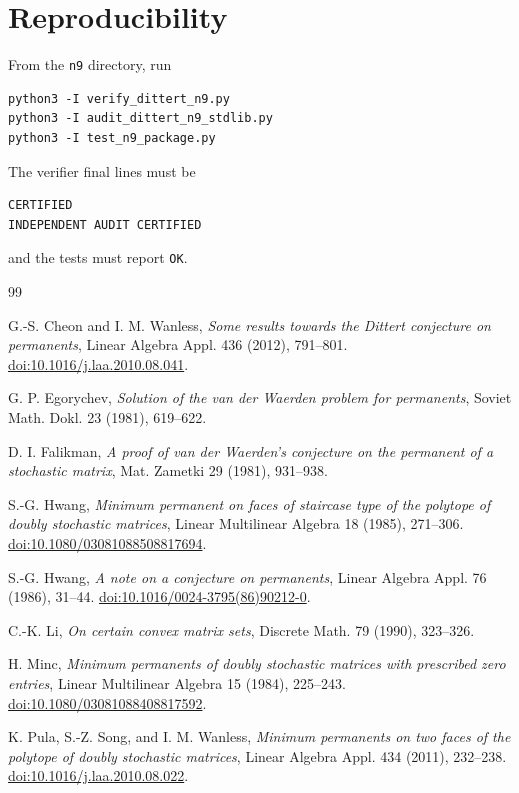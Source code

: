 \documentclass[11pt]{article}
\theoremstyle{remark}
\begin{document}
\section*{Reproducibility}

From the \texttt{n9} directory, run
\begin{verbatim}
python3 -I verify_dittert_n9.py
python3 -I audit_dittert_n9_stdlib.py
python3 -I test_n9_package.py
\end{verbatim}
The verifier final lines must be
\begin{verbatim}
CERTIFIED
INDEPENDENT AUDIT CERTIFIED
\end{verbatim}
and the tests must report \texttt{OK}.

\begin{thebibliography}{99}

G.-S. Cheon and I. M. Wanless,
\emph{Some results towards the Dittert conjecture on permanents},
Linear Algebra Appl. 436 (2012), 791--801.
\href{https://doi.org/10.1016/j.laa.2010.08.041}{doi:10.1016/j.laa.2010.08.041}.

G. P. Egorychev,
\emph{Solution of the van der Waerden problem for permanents},
Soviet Math. Dokl. 23 (1981), 619--622.

D. I. Falikman,
\emph{A proof of van der Waerden's conjecture on the permanent of a stochastic matrix},
Mat. Zametki 29 (1981), 931--938.

S.-G. Hwang,
\emph{Minimum permanent on faces of staircase type of the polytope of doubly stochastic matrices},
Linear Multilinear Algebra 18 (1985), 271--306.
\href{https://doi.org/10.1080/03081088508817694}{doi:10.1080/03081088508817694}.

S.-G. Hwang,
\emph{A note on a conjecture on permanents},
Linear Algebra Appl. 76 (1986), 31--44.
\href{https://doi.org/10.1016/0024-3795(86)90212-0}{doi:10.1016/0024-3795(86)90212-0}.

C.-K. Li,
\emph{On certain convex matrix sets},
Discrete Math. 79 (1990), 323--326.

H. Minc,
\emph{Minimum permanents of doubly stochastic matrices with prescribed zero entries},
Linear Multilinear Algebra 15 (1984), 225--243.
\href{https://doi.org/10.1080/03081088408817592}{doi:10.1080/03081088408817592}.

K. Pula, S.-Z. Song, and I. M. Wanless,
\emph{Minimum permanents on two faces of the polytope of doubly stochastic matrices},
Linear Algebra Appl. 434 (2011), 232--238.
\href{https://doi.org/10.1016/j.laa.2010.08.022}{doi:10.1016/j.laa.2010.08.022}.

\end{thebibliography}
\end{document}

